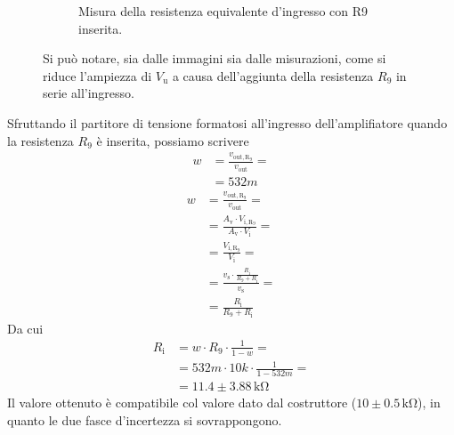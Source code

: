 \documentclass[a4paper]{article}
\begin{document}
\begin{figure}[h!]
\begin{subfigure}{0.4\textwidth}
						\caption{Misura della resistenza equivalente d'ingresso con R9 inserita.}
					\end{subfigure}
					\label{fig:misuraDellaResistenzaEquivalenteInIngressoAmplificatoreNonInvertente}
					\caption{Si può notare, sia dalle immagini sia dalle misurazioni, come si riduce l'ampiezza di $ V_{\mathrm{u}} $ a causa dell'aggiunta della resistenza $ R_{9} $ in serie all'ingresso.}
				\end{figure}
				\newpage
				Sfruttando il partitore di tensione formatosi all'ingresso dell'amplifiatore quando la resistenza $ R_{9} $ è inserita, possiamo scrivere
				\begin{equation*}
					\begin{split}
						w &= \frac{v_{\mathrm{out,R_{9}}}}{v_{\mathrm{out}}} = \\
						  &= 532m
					\end{split}
				\end{equation*}
				\begin{equation*}
					\begin{split}
						w &= \frac{v_{\mathrm{out,R_{9}}}}{v_{\mathrm{out}}} = \\
						  &= \frac{A_{\mathrm{v}} \cdot V_{\mathrm{i,R_{9}}}}{A_{\mathrm{v}} \cdot V_{\mathrm{i}}} = \\
						  &= \frac{V_{\mathrm{i,R_{9}}}}{V_{\mathrm{i}}} = \\
						  &= \frac{v_{\mathrm{s}} \cdot \frac{R_{\mathrm{i}}}{R_{9} + R_{\mathrm{i}}}}{v_{\mathrm{s}}} = \\
						  &= \frac{R_{\mathrm{i}}}{R_{9} + R_{\mathrm{i}}}
					\end{split}
				\end{equation*}
				Da cui
				\begin{equation*}
					\begin{split}
						R_{\mathrm{i}} &= w \cdot R_{9} \cdot \frac{1}{1 - w} = \\
									   &= 532m \cdot 10k \cdot \frac{1}{1 - 532m} = \\
									   &= 11.4 \pm 3.88 \, \mathrm{k\Omega}
					\end{split}
				\end{equation*}
				Il valore ottenuto è compatibile col valore dato dal costruttore ($ 10 \pm 0.5 \, \mathrm{k\Omega} $), in quanto le due fasce d'incertezza si sovrappongono.
\end{document}
